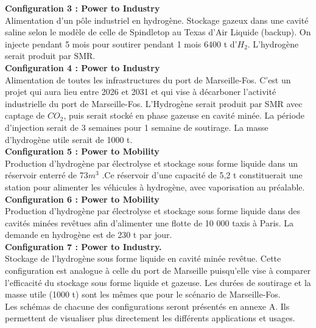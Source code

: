 \documentclass[11pt,french,a4paper]{article}
\begin{document}
\textbf{Configuration 3 :  Power to Industry } \\
Alimentation d’un pôle industriel en hydrogène. Stockage gazeux dans une cavité saline selon le modèle de celle de Spindletop au Texas d'Air Liquide (backup). On injecte pendant 5 mois pour soutirer pendant 1 mois 6400 t d’$H_2$. L’hydrogène serait produit par SMR. \\

\textbf{Configuration 4 : Power to Industry }\\
Alimentation de toutes les infrastructures du port de Marseille-Fos. C’est un projet qui aura lieu entre 2026 et 2031 et qui vise à décarboner l’activité industrielle du port de Marseille-Fos. L’Hydrogène serait produit par SMR avec captage de $CO_2$, puis serait stocké en phase gazeuse en cavité minée. La période d’injection serait de 3 semaines pour 1 semaine de soutirage. La masse d’hydrogène utile serait de 1000 t. \\

\textbf{Configuration 5 :  Power to Mobility }\\
Production d'hydrogène par électrolyse et stockage sous forme liquide dans un réservoir enterré de 73$m^3$ .Ce réservoir d’une capacité de 5,2 t constituerait une station pour alimenter les véhicules à hydrogène, avec vaporisation au préalable. \\

\textbf{Configuration 6 : Power to Mobility}\\
Production d'hydrogène par électrolyse et stockage sous forme liquide dans des cavités minées revêtues afin d’alimenter une flotte de 10 000 taxis à Paris. La demande en hydrogène est de 230 t par jour.  \\

\textbf{Configuration 7 : Power to Industry. }\\
Stockage de l'hydrogène sous forme liquide en cavité minée revêtue. Cette configuration est analogue à celle du port de Marseille puisqu’elle vise à comparer l’efficacité du stockage sous forme liquide et gazeuse. Les durées de soutirage et la masse utile (1000 t) sont les mêmes que pour le scénario de Marseille-Fos.\\

Les schémas de chacune des configurations seront présentés en annexe A. Ils permettent de visualiser plus directement les différents applications et usages.
\end{document}
